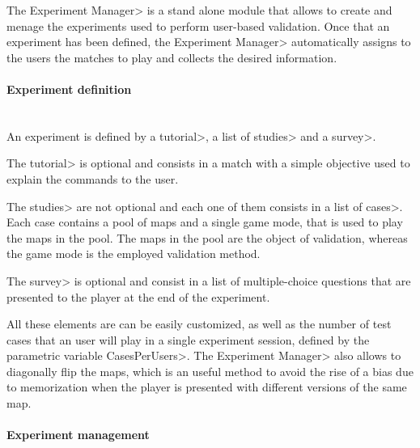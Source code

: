 The \<Experiment Manager> is a stand alone module that allows to create and menage the experiments used to perform user-based validation. Once that an experiment has been defined, the \<Experiment Manager> automatically assigns to the users the matches to play and collects the desired information.

\paragraph{Experiment definition}

\mbox{}\\

{\setlength{\parindent}{0cm}
An experiment is defined by a \<tutorial>, a list of \<studies> and a \<survey>.}

\par

The \<tutorial> is optional and consists in a match with a simple objective used to explain the commands to the user.

\par

The \<studies> are not optional and each one of them consists in a list of \<cases>. Each case contains a pool of maps and a single game mode, that is used to play the maps in the pool. The maps in the pool are the object of validation, whereas the game mode is the employed validation method.

\par

The \<survey> is optional and consist in a list of multiple-choice questions that are presented to the player at the end of the experiment.

\par

All these elements are can be easily customized, as well as the number of test cases that an user will play in a single experiment session, defined by the parametric variable \<CasesPerUsers>. The \<Experiment Manager> also allows to diagonally flip the maps, which is an useful method to avoid the rise of a bias due to memorization when the player is presented with different versions of the same map.

\paragraph{Experiment management}

\mbox{}\\

